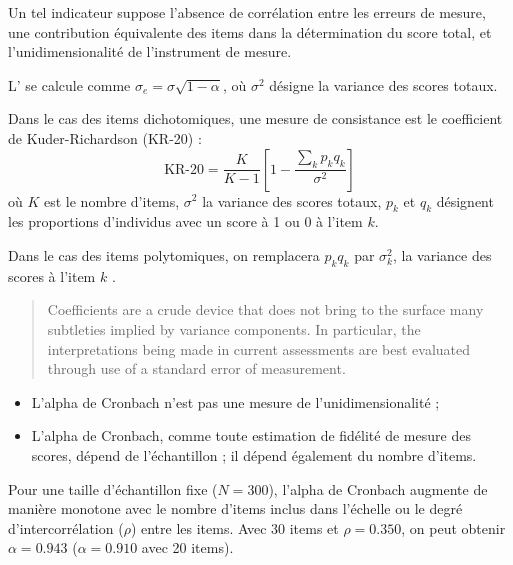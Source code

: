Un tel indicateur suppose l'absence de corrélation entre les erreurs de mesure,
une contribution équivalente des items dans la détermination du score total, et
l'unidimensionalité de l'instrument de mesure.

L' se calcule comme $\sigma_e =
\sigma\sqrt{1-\alpha}$, où $\sigma^2$ désigne la variance des scores totaux.

Dans le cas des items dichotomiques, une mesure de consistance est le
coefficient de Kuder-Richardson (KR-20) \autocite{kuder37}:
\begin{equation}
\text{KR-20}=\frac{K}{K-1}\left[1-\frac{\sum_k p_kq_k}{\sigma^2}\right]
\end{equation}
où $K$ est le nombre d'items, $\sigma^2$ la variance des scores totaux, $p_k$
et $q_k$ désignent les proportions d'individus avec un score à 1 ou 0 à l'item
$k$. 

Dans le cas des items polytomiques, on remplacera $p_kq_k$ par
$\sigma_k^2$, la variance des scores à l'item $k$ \autocite{cronbach51}.


\begin{quote}
Coefficients are a crude device that does not bring to the surface
many subtleties implied by variance components. In particular, the
interpretations being made in current assessments are best evaluated
through use of a standard error of measurement\autocite{Cronbach2004}.
\end{quote}

\begin{itemize}
\item L'alpha de Cronbach n'est pas une mesure de
  l'unidimensionalité\autocite{danes84} ;
\item L'alpha de Cronbach, comme toute estimation de fidélité de mesure des
  scores, dépend de l'échantillon ; il dépend également du nombre d'items.
\end{itemize}

\foilhead{}

Pour une taille d'échantillon fixe ($N=300$), l'alpha de Cronbach augmente de
manière monotone avec le nombre d'items inclus dans l'échelle ou le degré
d'intercorrélation ($\rho$) entre les items. Avec 30 items et $\rho=0.350$, on
peut obtenir $\alpha=0.943$ ($\alpha=0.910$ avec 20 items).

